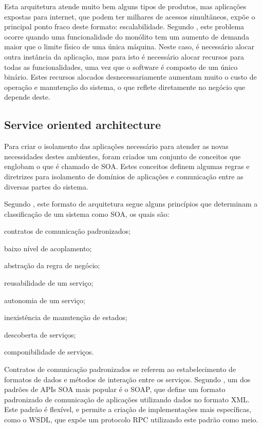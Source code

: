 Esta arquitetura atende muito bem alguns tipos de produtos, mas aplicações
expostas para internet, que podem ter milhares de acessos simultâneos,
expõe o principal ponto fraco deste formato: escalabilidade. Segundo
, este problema ocorre quando uma funcionalidade do
monólito tem um aumento de demanda maior que o limite físico de uma única
máquina. Neste caso, é necessário alocar outra instância da aplicação,
mas para isto é necessário alocar recursos para todas as funcionalidades,
uma vez que o software é composto de um único binário. Estes recursos alocados
desnecessariamente aumentam muito o custo de operação e manutenção do
sistema, o que reflete diretamente no negócio que depende deste.

\subsection{Service oriented architecture}

Para criar o isolamento das aplicações necessário para atender as novas
necessidades destes ambientes, foram criados um conjunto de conceitos
que englobam o que é chamado de \ac{SOA}. Estes conceitos definem algumas
regras e diretrizes para isolamento de domínios de aplicações e comunicação
entre as diversas partes do sistema.

Segundo , este formato de arquitetura segue alguns
princípios que determinam a classificação de um sistema como \ac{SOA},
os quais são:

\begin{alineas}
  \item contratos de comunicação padronizados;
  \item baixo nível de acoplamento;
  \item abstração da regra de negócio;
  \item reusabilidade de um serviço;
  \item autonomia de um serviço;
  \item inexistência de manutenção de estados;
  \item descoberta de serviços;
  \item componibilidade de serviços.
\end{alineas}

Contratos de comunicação padronizados se referem ao estabelecimento de
formatos de dados e métodos de interação entre os serviços. Segundo
, um dos padrões de APIs SOA mais popular é o
\ac{SOAP}, que define um formato padronizado de comunicação de
aplicações utilizando dados no formato \ac{XML}. Este padrão é flexível,
e permite a criação de implementações mais específicas, como o \ac{WSDL},
que expõe um protocolo \ac{RPC} utilizando este padrão como meio.

